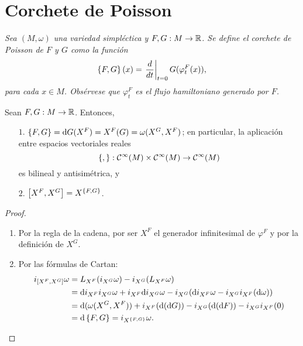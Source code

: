 \section{Corchete de Poisson}\label{sec:poisson}
\begin{defn}
  \em
  Sea $(M,\omega)$ una variedad simpléctica y $F,G: M \rightarrow \mathbb{R}$. Se define el \emph{corchete de Poisson de $F$ y $G$} como la función
\begin{equation*}
  \left\lbrace F,G\right\rbrace(x) = \left.\frac{d}{dt}\right|_{t=0}G(\varphi^F_t(x)),
\end{equation*}
para cada $x \in M$. Obsérvese que $\varphi_t^F$ es el flujo hamiltoniano generado por $F$.
\end{defn}
\begin{prop}\leavevmode
  Sean $F,G:M\rightarrow \mathbb{R}$. Entonces,
  \begin{enumerate}
    \item[$1$.] $\left\lbrace F,G\right\rbrace = \mathrm{d} G (X^F)=X^F(G)= \omega(X^ G, X^F)$; en particular, la aplicación entre espacios vectoriales reales $$\left\lbrace , \right\rbrace: \mathcal{C}^{\infty}(M) \times \mathcal{C}^{\infty}(M) \rightarrow \mathcal{C}^{\infty}(M)$$ es bilineal y antisimétrica, y 
    \item[$2$.] $\left[X^F,X^G\right] = X^{\left\lbrace F,G\right\rbrace}$.
  \end{enumerate}
\end{prop}
\begin{proof}\leavevmode
  \begin{enumerate}
    \item Por la regla de la cadena, por ser $X^ F$ el generador infinitesimal de $\varphi^F$ y por la definición de $X^G$.
    \item Por las fórmulas de Cartan:
      \begin{align*}
	i_{\left[X^F,X^G\right]} \omega & =  L_{X^F}(i_{X^G}\omega) - i_{X^G}(L_{X^F} \omega) \\ 
	& = \mathrm{d} i_{X^F}i_{X^G}\omega + i_{X^F}\mathrm{d} i_{X^G}\omega - i_{X^G}(\mathrm{d} i_{X^F}\omega - i_{X^G}i_{X^F}(\mathrm{d} \omega)) \\
	& = \mathrm{d} (\omega(X^G,X^F)) + i_{X^F}(\mathrm{d}(\mathrm{d} G)) - i_{X^G}(\mathrm{d} (\mathrm{d} F)) - i_{X^G}i_{X^F}(0) \\
	& = \mathrm{d} \left\lbrace F,G\right\rbrace = i_{X^{\left\lbrace F,G\right\rbrace}}\omega.
      \end{align*}
  \end{enumerate}
\end{proof}

